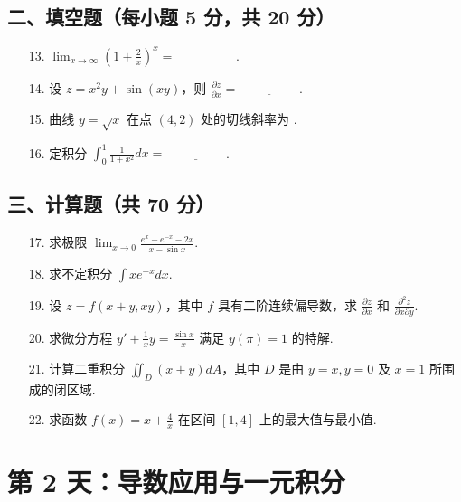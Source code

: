 \documentclass[11pt,a4paper]{article}
\begin{document}
\subsection*{二、填空题（每小题 5 分，共 20 分）}
\begin{enumerate}
    \item[13.] $\lim_{x \to \infty} (1 + \frac{2}{x})^x = \underline{\hspace{2cm}}$.
    \item[14.] 设 $z = x^2 y + \sin(xy)$，则 $\frac{\partial z}{\partial x} = \underline{\hspace{2cm}}$.
    \item[15.] 曲线 $y = \sqrt{x}$ 在点 $(4, 2)$ 处的切线斜率为 \underline{\hspace{2cm}}.
    \item[16.] 定积分 $\int_{0}^{1} \frac{1}{1+x^2} dx = \underline{\hspace{2cm}}$.
\end{enumerate}
\subsection*{三、计算题（共 70 分）}
\begin{enumerate}
    \item[17.] 求极限 $\lim_{x \to 0} \frac{e^x - e^{-x} - 2x}{x - \sin x}$.
    \item[18.] 求不定积分 $\int x e^{-x} dx$.
    \item[19.] 设 $z = f(x+y, xy)$，其中 $f$ 具有二阶连续偏导数，求 $\frac{\partial z}{\partial x}$ 和 $\frac{\partial^2 z}{\partial x \partial y}$.
    \item[20.] 求微分方程 $y' + \frac{1}{x}y = \frac{\sin x}{x}$ 满足 $y(\pi) = 1$ 的特解.
    \item[21.] 计算二重积分 $\iint_{D} (x+y) dA$，其中 $D$ 是由 $y=x, y=0$ 及 $x=1$ 所围成的闭区域.
    \item[22.] 求函数 $f(x) = x + \frac{4}{x}$ 在区间 $[1, 4]$ 上的最大值与最小值.
\end{enumerate}

\newpage

\section*{第 2 天：导数应用与一元积分}
\end{document}
